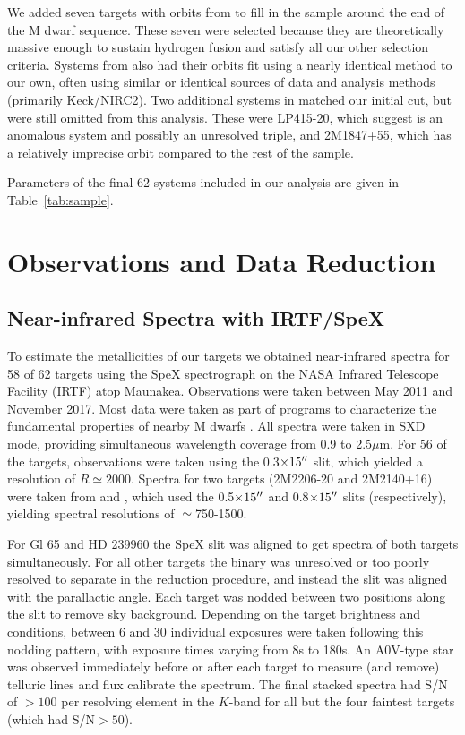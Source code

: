 \documentclass[twocolumn]{aastex62}
\begin{document}
We added seven targets with orbits from \citet{Dupuy2017} to fill in the sample around the end of the M dwarf sequence. These seven were selected because they are theoretically massive enough to sustain hydrogen fusion and satisfy all our other selection criteria. Systems from \citet{Dupuy2017} also had their orbits fit using a nearly identical method to our own, often using similar or identical sources of data and analysis methods (primarily Keck/NIRC2). Two additional systems in \citet{Dupuy2017} matched our initial cut, but were still omitted from this analysis. These were LP415-20, which \citet{Dupuy2017} suggest is an anomalous system and possibly an unresolved triple, and 2M1847+55, which has a relatively imprecise orbit compared to the rest of the sample.

Parameters of the final 62 systems included in our analysis are given in Table~\ref{tab:sample}.

\section{Observations and Data Reduction}\label{sec:obs} 

\subsection{Near-infrared Spectra with IRTF/SpeX}

To estimate the metallicities of our targets we obtained near-infrared spectra for 58 of 62 targets using the SpeX spectrograph \citep{Rayner:2003} on the NASA Infrared Telescope Facility (IRTF) atop Maunakea. Observations were taken between May 2011 and November 2017. Most data were taken as part of programs to characterize the fundamental properties of nearby M dwarfs \citep[e.g.,][]{Mann2013c,Gaidos2014,Terrien2015}. All spectra were taken in SXD mode, providing simultaneous wavelength coverage from 0.9 to 2.5$\mu$m. For 56 of the targets, observations were taken using the 0.3$\times15\mbox{$^{\prime\prime}$}$ slit, which yielded a resolution of $R\simeq2000$. Spectra for two targets (2M2206-20 and 2M2140+16) were taken from \citet{2009ApJ...706..328D} and \citet{Dupuy2012}, which used the 0.5$\times15\mbox{$^{\prime\prime}$}$ and 0.8$\times15\mbox{$^{\prime\prime}$}$ slits (respectively), yielding spectral resolutions of $\simeq$750-1500. 

For Gl 65 and HD 239960 the SpeX slit was aligned to get spectra of both targets simultaneously. For all other targets the binary was unresolved or too poorly resolved to separate in the reduction procedure, and instead the slit was aligned with the parallactic angle. Each target was nodded between two positions along the slit to remove sky background. Depending on the target brightness and conditions, between 6 and 30 individual exposures were taken following this nodding pattern, with exposure times varying from 8s to 180s. An A0V-type star was observed immediately before or after each target to measure (and remove) telluric lines and flux calibrate the spectrum. The final stacked spectra had S/N of $>100$ per resolving element in the $K$-band for all but the four faintest targets (which had S/N$>50$). 
\end{document}
